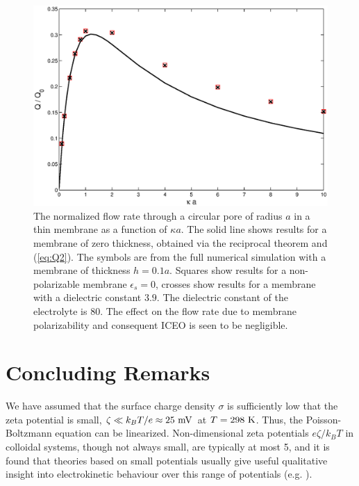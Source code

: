 \begin{figure}[h]
\centering
\includegraphics[width = 1.0\textwidth]{zero_thickness/figure5.eps}
\caption{The normalized flow rate through a circular pore of radius $a$ in a thin membrane 
as a function of $\kappa a$. The solid line shows results for a membrane of zero thickness,
obtained via the reciprocal theorem and (\ref{eq:Q2}).
The symbols are from the full numerical simulation with a membrane
of thickness $h = 0.1a$.
Squares show results for
 a non-polarizable membrane $\epsilon_s=0$, crosses show results for 
 a membrane with a dielectric constant $3.9$. The  dielectric constant of 
 the electrolyte is $80$. The effect on the flow rate
due to membrane polarizability and consequent ICEO
 is seen to be negligible.}
\label{fig:QaKappaEpw0}
\end{figure}

\section{Concluding Remarks}\label{sec:conclusion}
We have assumed that the surface charge density $\sigma$ is sufficiently low 
that the zeta potential is small, $\zeta\ll k_BT/e\approx 25\rm\ mV$ at $T=298\rm\ K$.
Thus, the Poisson-Boltzmann equation can be linearized.
Non-dimensional zeta potentials $e\zeta/k_BT$ in colloidal systems, though not always small, are typically at most 5, and it is found that theories based on small potentials usually give useful
qualitative insight into electrokinetic behaviour over this range of potentials (e.g. \cite{levine1975}).

